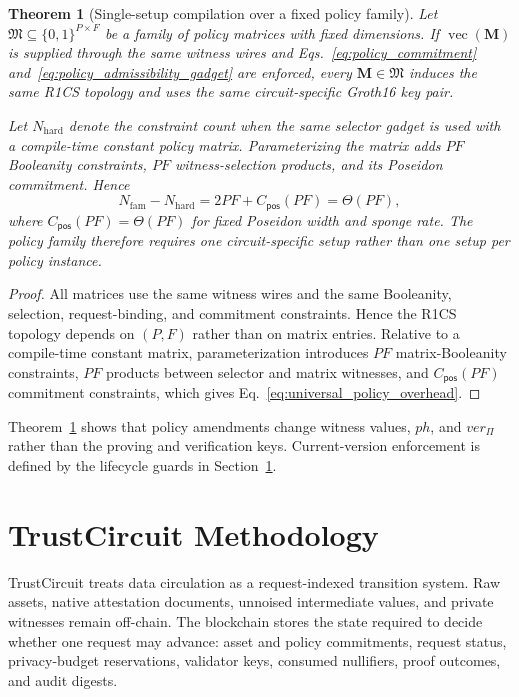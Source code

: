 \documentclass[10pt,journal,compsoc]{IEEEtran}
\newtheorem{theorem}{Theorem}
\begin{document}
\begin{theorem}[Single-setup compilation over a fixed policy family]
\label{thm:setup_amortization}
Let $\mathfrak{M}\subseteq\{0,1\}^{P\times F}$ be a family of policy matrices with fixed dimensions. If $\operatorname{vec}(\mathbf{M})$ is supplied through the same witness wires and Eqs.~\eqref{eq:policy_commitment} and~\eqref{eq:policy_admissibility_gadget} are enforced, every $\mathbf{M}\in\mathfrak{M}$ induces the same R1CS topology and uses the same circuit-specific Groth16 key pair.

Let $N_{\mathrm{hard}}$ denote the constraint count when the same selector gadget is used with a compile-time constant policy matrix. Parameterizing the matrix adds $PF$ Booleanity constraints, $PF$ witness-selection products, and its Poseidon commitment. Hence
\begin{equation}
N_{\mathrm{fam}}-N_{\mathrm{hard}}
=
2PF+C_{\mathsf{pos}}(PF)
=
\Theta(PF),
\label{eq:universal_policy_overhead}
\end{equation}
where $C_{\mathsf{pos}}(PF)=\Theta(PF)$ for fixed Poseidon width and sponge rate. The policy family therefore requires one circuit-specific setup rather than one setup per policy instance.
\end{theorem}

\begin{proof}
All matrices use the same witness wires and the same Booleanity, selection, request-binding, and commitment constraints. Hence the R1CS topology depends on $(P,F)$ rather than on matrix entries. Relative to a compile-time constant matrix, parameterization introduces $PF$ matrix-Booleanity constraints, $PF$ products between selector and matrix witnesses, and $C_{\mathsf{pos}}(PF)$ commitment constraints, which gives Eq.~\eqref{eq:universal_policy_overhead}.
\end{proof}

Theorem~\ref{thm:setup_amortization} shows that policy amendments change witness values, $ph$, and $ver_{\Pi}$ rather than the proving and verification keys. Current-version enforcement is defined by the lifecycle guards in Section~\ref{sec:method}.

\section{TrustCircuit Methodology}
\label{sec:method}

TrustCircuit treats data circulation as a request-indexed transition system. Raw assets, native attestation documents, unnoised intermediate values, and private witnesses remain off-chain. The blockchain stores the state required to decide whether one request may advance: asset and policy commitments, request status, privacy-budget reservations, validator keys, consumed nullifiers, proof outcomes, and audit digests.
\end{document}
